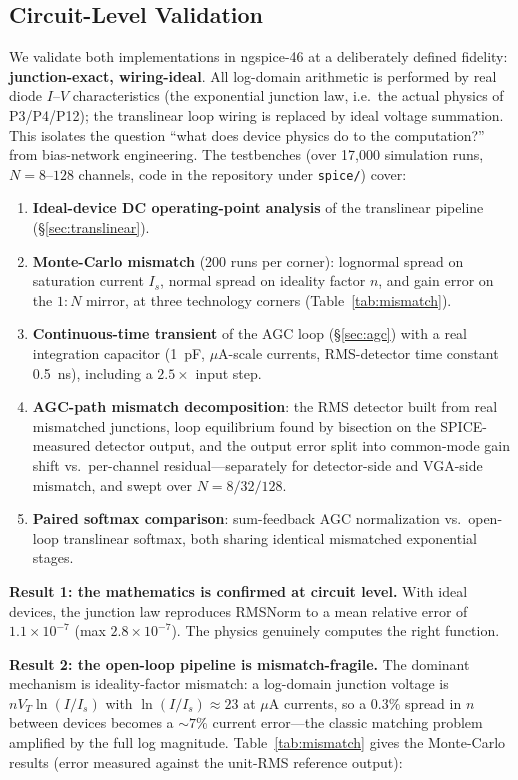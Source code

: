 \documentclass[11pt]{article}
\begin{document}
\subsection{Circuit-Level Validation}
\label{sec:validation}

We validate both implementations in ngspice-46 at a deliberately defined fidelity: \textbf{junction-exact, wiring-ideal}. All log-domain arithmetic is performed by real diode $I$--$V$ characteristics (the exponential junction law, i.e.\ the actual physics of P3/P4/P12); the translinear loop wiring is replaced by ideal voltage summation. This isolates the question ``what does device physics do to the computation?'' from bias-network engineering. The testbenches (over 17{,}000 simulation runs, $N=8$--$128$ channels, code in the repository under \texttt{spice/}) cover:

\begin{enumerate}[leftmargin=*]
\item \textbf{Ideal-device DC operating-point analysis} of the translinear pipeline (\S\ref{sec:translinear}).
\item \textbf{Monte-Carlo mismatch} (200 runs per corner): lognormal spread on saturation current $I_s$, normal spread on ideality factor $n$, and gain error on the $1{:}N$ mirror, at three technology corners (Table~\ref{tab:mismatch}).
\item \textbf{Continuous-time transient} of the AGC loop (\S\ref{sec:agc}) with a real integration capacitor (1~pF, $\mu$A-scale currents, RMS-detector time constant 0.5~ns), including a $2.5\times$ input step.
\item \textbf{AGC-path mismatch decomposition}: the RMS detector built from real mismatched junctions, loop equilibrium found by bisection on the SPICE-measured detector output, and the output error split into common-mode gain shift vs.\ per-channel residual---separately for detector-side and VGA-side mismatch, and swept over $N=8/32/128$.
\item \textbf{Paired softmax comparison}: sum-feedback AGC normalization vs.\ open-loop translinear softmax, both sharing identical mismatched exponential stages.
\end{enumerate}

\textbf{Result 1: the mathematics is confirmed at circuit level.} With ideal devices, the junction law reproduces RMSNorm to a mean relative error of $1.1\times10^{-7}$ (max $2.8\times10^{-7}$). The physics genuinely computes the right function.

\textbf{Result 2: the open-loop pipeline is mismatch-fragile.} The dominant mechanism is ideality-factor mismatch: a log-domain junction voltage is $n V_T \ln(I/I_s)$ with $\ln(I/I_s) \approx 23$ at $\mu$A currents, so a $0.3\%$ spread in $n$ between devices becomes a ${\sim}7\%$ current error---the classic matching problem~\cite{pelgrom1989} amplified by the full log magnitude. Table~\ref{tab:mismatch} gives the Monte-Carlo results (error measured against the unit-RMS reference output):
\end{document}
